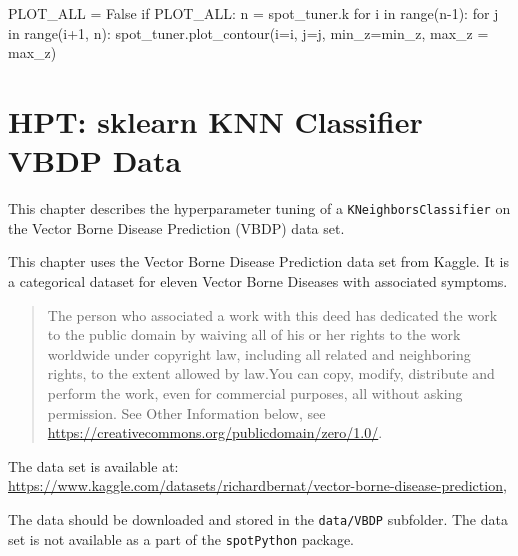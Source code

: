 \documentclass[
  letterpaper,
  DIV=11,
  numbers=noendperiod]{scrreprt}
\newenvironment{Shaded}{\begin{snugshade}}{\end{snugshade}}
\newcommand{\BuiltInTok}[1]{\textcolor[rgb]{0.00,0.23,0.31}{#1}}
\newcommand{\ControlFlowTok}[1]{\textcolor[rgb]{0.00,0.23,0.31}{#1}}
\newcommand{\DecValTok}[1]{\textcolor[rgb]{0.68,0.00,0.00}{#1}}
\newcommand{\KeywordTok}[1]{\textcolor[rgb]{0.00,0.23,0.31}{#1}}
\newcommand{\NormalTok}[1]{\textcolor[rgb]{0.00,0.23,0.31}{#1}}
\newcommand{\OperatorTok}[1]{\textcolor[rgb]{0.37,0.37,0.37}{#1}}
\newcommand{\VariableTok}[1]{\textcolor[rgb]{0.07,0.07,0.07}{#1}}
\begin{document}
\begin{Shaded}
\begin{Highlighting}[]
\NormalTok{PLOT\_ALL }\OperatorTok{=} \VariableTok{False}
\ControlFlowTok{if}\NormalTok{ PLOT\_ALL:}
\NormalTok{    n }\OperatorTok{=}\NormalTok{ spot\_tuner.k}
    \ControlFlowTok{for}\NormalTok{ i }\KeywordTok{in} \BuiltInTok{range}\NormalTok{(n}\OperatorTok{{-}}\DecValTok{1}\NormalTok{):}
        \ControlFlowTok{for}\NormalTok{ j }\KeywordTok{in} \BuiltInTok{range}\NormalTok{(i}\OperatorTok{+}\DecValTok{1}\NormalTok{, n):}
\NormalTok{            spot\_tuner.plot\_contour(i}\OperatorTok{=}\NormalTok{i, j}\OperatorTok{=}\NormalTok{j, min\_z}\OperatorTok{=}\NormalTok{min\_z, max\_z }\OperatorTok{=}\NormalTok{ max\_z)}
\end{Highlighting}
\end{Shaded}

\hypertarget{sec-hpt-sklearn-knn-classifier-vbdp-data}{%
\chapter{HPT: sklearn KNN Classifier VBDP
Data}\label{sec-hpt-sklearn-knn-classifier-vbdp-data}}

This chapter describes the hyperparameter tuning of a
\texttt{KNeighborsClassifier} on the Vector Borne Disease Prediction
(VBDP) data set.

\begin{tcolorbox}[enhanced jigsaw, left=2mm, title=\textcolor{quarto-callout-important-color}{\faExclamation}\hspace{0.5em}{Vector Borne Disease Prediction Data Set}, titlerule=0mm, toprule=.15mm, leftrule=.75mm, colbacktitle=quarto-callout-important-color!10!white, colback=white, arc=.35mm, toptitle=1mm, bottomtitle=1mm, colframe=quarto-callout-important-color-frame, bottomrule=.15mm, rightrule=.15mm, breakable, coltitle=black, opacitybacktitle=0.6, opacityback=0]

This chapter uses the Vector Borne Disease Prediction data set from
Kaggle. It is a categorical dataset for eleven Vector Borne Diseases
with associated symptoms.

\begin{quote}
The person who associated a work with this deed has dedicated the work
to the public domain by waiving all of his or her rights to the work
worldwide under copyright law, including all related and neighboring
rights, to the extent allowed by law.You can copy, modify, distribute
and perform the work, even for commercial purposes, all without asking
permission. See Other Information below, see
\url{https://creativecommons.org/publicdomain/zero/1.0/}.
\end{quote}

The data set is available at:
\url{https://www.kaggle.com/datasets/richardbernat/vector-borne-disease-prediction},

The data should be downloaded and stored in the \texttt{data/VBDP}
subfolder. The data set is not available as a part of the
\texttt{spotPython} package.

\end{tcolorbox}
\end{document}
